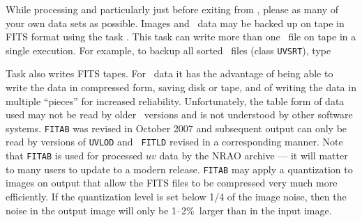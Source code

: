      While processing and particularly just before exiting from \AIPS,
please  as many of your own data sets as
possible.
Images and \uv\ data may be backed up on tape in FITS format using the
task \hbox{{\tt {}}}.  This task can write more than one
\AIPS\ file on tape in a single execution.  For example, to backup all
sorted \uv\ files (class {\tt UVSRT}), type

Task {\tt {}} also writes FITS tapes.  For \uv\ data it has
the advantage of being able to write the data in compressed form,
saving disk or tape, and of writing the data in multiple ``pieces''
for increased reliability.  Unfortunately, the table form of data used
may not be read by older \AIPS\ versions and is not understood by
other software systems.  {\tt FITAB} was revised in October 2007 and
subsequent output can only be read by versions of {\tt UVLOD} and {\tt
FITLD} revised in a corresponding manner.  Note that {\tt FITAB} is
used for processed $uv$ data by the NRAO archive --- it will matter to
many users to update to a modern release.  {\tt FITAB} may apply a
quantization to images on output that allow the FITS files to be
compressed very much more efficiently.  If the quantization level is
set below 1/4 of the image noise, then the noise in the output image
will only be 1--2\%\ larger than in the input image.


